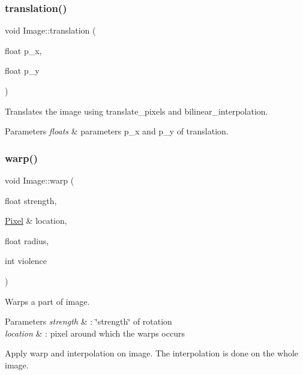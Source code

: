 \subsubsection{\texorpdfstring{translation()}{translation()}}
{\footnotesize\ttfamily void Image\+::translation (\begin{DoxyParamCaption}\item[{float}]{p\+\_\+x,  }\item[{float}]{p\+\_\+y }\end{DoxyParamCaption})}



Translates the image using translate\+\_\+pixels and bilinear\+\_\+interpolation. 


\begin{DoxyParams}{Parameters}
{\em floats} & parameters p\+\_\+x and p\+\_\+y of translation. \\
\hline
\end{DoxyParams}
\mbox{\label{class_image_a514a67255f9227495b3fc807cec17b09}} 
\subsubsection{\texorpdfstring{warp()}{warp()}}
{\footnotesize\ttfamily void Image\+::warp (\begin{DoxyParamCaption}\item[{float}]{strength,  }\item[{\hyperlink{class_pixel}{Pixel} \&}]{location,  }\item[{float}]{radius,  }\item[{int}]{violence }\end{DoxyParamCaption})}



Warps a part of image. 


\begin{DoxyParams}{Parameters}
{\em strength} & \+: \char`\"{}strength\char`\"{} of rotation \\
\hline
{\em location} & \+: pixel around which the warps occurs\\
\hline
\end{DoxyParams}
Apply warp and interpolation on image. The interpolation is done on the whole image. \mbox{\label{class_image_a0b096c96e00fce35e5485699636618ce}} 
